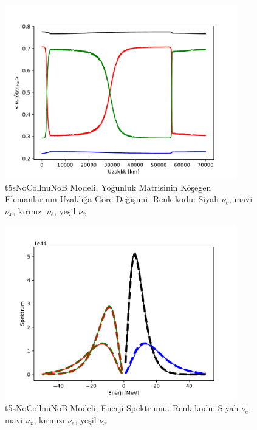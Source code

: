\newpage
\begin{figure}[hbt!]
    \centering
    \includegraphics[width=0.9\textwidth]{figures/t5sNoCollnuNoB_distdiag10.pdf}
    \caption[t5sNoCollnuNoB Modeli, Yoğunluk Matrisinin Köşegen Elemanlarının Uzaklığa Göre Değişimi.]{t5sNoCollnuNoB Modeli, Yoğunluk Matrisinin Köşegen Elemanlarının Uzaklığa Göre Değişimi. Renk kodu: Siyah $ \nu_{e} $, mavi $ \nu_{x} $, kırmızı $ \nu_{\bar{e}} $, yeşil $ \nu_{\bar{x}} $}
    \label{fig:t5sNoCollnuNoB_distdiag10}
\end{figure}
\begin{figure}[hbt!]
    \centering
    \includegraphics[width=0.9\textwidth]{figures/t5sNoCollnuNoB_spectrum.pdf}
    \caption[t5sNoCollnuNoB Modeli, Enerji Spektrumu.]{t5sNoCollnuNoB Modeli, Enerji Spektrumu. Renk kodu: Siyah $ \nu_{e} $, mavi $ \nu_{x} $, kırmızı $ \nu_{\bar{e}} $, yeşil $ \nu_{\bar{x}} $}
    \label{fig:t5sNoCollnuNoB_spectrum}
\end{figure}

